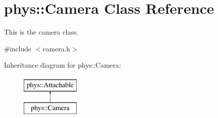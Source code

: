 \hypertarget{classphys_1_1Camera}{
\section{phys::Camera Class Reference}
\label{d9/df8/classphys_1_1Camera}
}


This is the camera class.  




{\ttfamily \#include $<$camera.h$>$}

Inheritance diagram for phys::Camera:\begin{figure}[H]
\begin{center}
\leavevmode
\includegraphics[height=2cm]{d9/df8/classphys_1_1Camera}
\end{center}
\end{figure}

